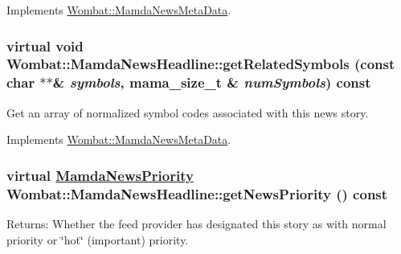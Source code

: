 Implements \hyperlink{classWombat_1_1MamdaNewsMetaData_548e87226465849d482b2644c103c67e}{Wombat::Mamda\-News\-Meta\-Data}.\hypertarget{classWombat_1_1MamdaNewsHeadline_dfa06642c61fa25ebd63f55d587f54fe}{
\subsubsection[getRelatedSymbols]{\setlength{\rightskip}{0pt plus 5cm}virtual void Wombat::Mamda\-News\-Headline::get\-Related\-Symbols (const char $\ast$$\ast$\& {\em symbols}, mama\_\-size\_\-t \& {\em num\-Symbols}) const}}
\label{classWombat_1_1MamdaNewsHeadline_dfa06642c61fa25ebd63f55d587f54fe}


Get an array of normalized symbol codes associated with this news story. 



Implements \hyperlink{classWombat_1_1MamdaNewsMetaData_8ed97f443c8892110d53d7c2a42b8fbf}{Wombat::Mamda\-News\-Meta\-Data}.\hypertarget{classWombat_1_1MamdaNewsHeadline_716f900c705f9d4ee783bdb791779e68}{
\subsubsection[getNewsPriority]{\setlength{\rightskip}{0pt plus 5cm}virtual \hyperlink{namespaceWombat_faa7709d230f261c8aeb71420f6dd012}{Mamda\-News\-Priority} Wombat::Mamda\-News\-Headline::get\-News\-Priority () const}}
\label{classWombat_1_1MamdaNewsHeadline_716f900c705f9d4ee783bdb791779e68}


\begin{Desc}
\item[Returns:]Whether the feed provider has designated this story as with normal priority or \char`\"{}hot\char`\"{} (important) priority. \end{Desc}



